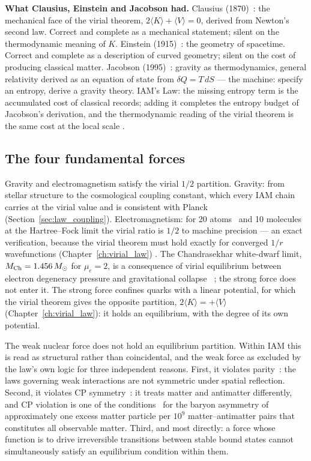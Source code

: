 \textbf{What Clausius, Einstein and Jacobson had.} Clausius (1870)~\cite{Clausius1870}: the mechanical face of the virial theorem, $2\langle K\rangle+\langle
V\rangle=0$, derived from Newton's second law. Correct and complete as a mechanical statement; silent on the thermodynamic meaning of $K$. Einstein
(1915)~\cite{Einstein1915}: the geometry of spacetime. Correct and complete as a description of curved geometry; silent on the cost of producing classical
matter. Jacobson (1995)~\cite{Jacobson1995}: gravity as thermodynamics, general relativity derived as an equation of state from $\delta Q=T\,dS$ --- the
machine: specify an entropy, derive a gravity theory. IAM's Law: the missing entropy term is the accumulated cost of classical records; adding it completes
the entropy budget of Jacobson's derivation, and the thermodynamic reading of the virial theorem is the same cost at the local scale \interp.

\subsection{The four fundamental forces}
Gravity and electromagnetism satisfy the virial $1/2$ partition. Gravity: from stellar structure to the cosmological coupling constant, which every
IAM chain carries at the virial value and is consistent with Planck (Section~\ref{sec:law_coupling}). Electromagnetism: for 20 atoms~\cite{ClementiRoetti1974} and 10 molecules at the
Hartree--Fock limit the virial ratio is $1/2$ to machine precision --- an exact verification, because the virial theorem must hold exactly
for converged $1/r$ wavefunctions (Chapter~\ref{ch:virial_law}) \derived. The Chandrasekhar white-dwarf limit, $M_{\rm Ch}=1.456\,M_\odot$ for $\mu_e=2$, is
a consequence of virial equilibrium between electron degeneracy pressure and gravitational collapse~\cite{Chandrasekhar1931} \derived; the strong force
does not enter it. The strong force confines quarks with a linear potential, for which the virial theorem gives the opposite partition,
$2\langle K\rangle=+\langle V\rangle$ (Chapter~\ref{ch:virial_law}): it holds an equilibrium, with the degree of its own potential.

The weak nuclear force does not hold an equilibrium partition. Within IAM this is read as structural rather than coincidental, and the weak force as
excluded by the law's own logic for three independent reasons. First, it violates parity~\cite{Wu1957}: the laws governing weak interactions are not
symmetric under spatial reflection. Second, it violates CP symmetry~\cite{Christenson1964}: it treats matter and antimatter differently, and CP violation is
one of the conditions~\cite{Sakharov1967} for the baryon asymmetry of approximately one excess matter particle per $10^9$ matter--antimatter pairs that
constitutes all observable matter. Third, and most directly: a force whose function is to drive irreversible transitions between stable bound states cannot
simultaneously satisfy an equilibrium condition within them. \conjecture


